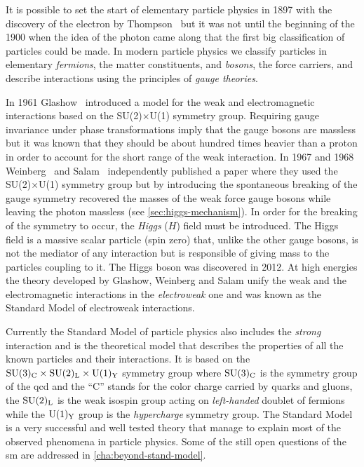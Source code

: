 It is possible to set the start of elementary particle physics in 1897 with the
discovery of the electron by Thompson~\cite{ThompsonBook} but it was not until
the beginning of the 1900 when the idea of the photon came along that the first
big classification of particles could be made. In modern particle physics we
classify particles in elementary \emph{fermions}, the matter constituents, and
\emph{bosons}, the force carriers, and describe interactions using the
principles of \emph{gauge theories}.

In 1961 Glashow~\cite{GlashowPaper} introduced a model for the weak and
electromagnetic interactions based on the SU(2)$\times$U(1) symmetry
group. Requiring gauge invariance under phase transformations imply that the
gauge bosons are massless but it was known that they should be about hundred
times heavier than a proton in order to account for the short range of the weak
interaction. In 1967 and 1968 Weinberg~\cite{WeinbergPaper} and
Salam~\cite{SalamPaper} independently published a paper where they used the
SU(2)$\times$U(1) symmetry group but by introducing the spontaneous breaking of
the gauge symmetry recovered the masses of the weak force gauge bosons while
leaving the photon massless (see \cref{sec:higgs-mechanism}). In order for the
breaking of the symmetry to occur, the \emph{Higgs} ($H$) field must be
introduced. The Higgs field is a massive scalar particle (spin zero) that,
unlike the other gauge bosons, is not the mediator of any interaction but is
responsible of giving mass to the particles coupling to it. The Higgs boson was
discovered in 2012. At high energies the theory developed by Glashow, Weinberg
and Salam unify the weak and the electromagnetic interactions in the
\emph{electroweak} one and was known as the Standard Model of electroweak
interactions.

Currently the Standard Model of particle physics also includes the \emph{strong}
interaction and is the theoretical model that describes the properties of all
the known particles and their interactions. It is based on the
$\mathrm{SU}(3)_\mathrm{C} \times \mathrm{SU}(2)_\mathrm{L} \times \mathrm{U}(1)_\mathrm{Y}$ symmetry group where $\mathrm{SU}(3)_\mathrm{C}$ is the
symmetry group of the \gls{qcd} and the ``C'' stands for the color charge
carried by quarks and gluons, the $\mathrm{SU}(2)_\mathrm{L}$ is the weak isospin group acting on
\emph{left-handed} doublet of fermions while the $\mathrm{U}(1)_\mathrm{Y}$ group is the
\emph{hypercharge} symmetry group. The Standard Model is a very successful and
well tested theory that manage to explain most of the observed phenomena in
particle physics. Some of the still open questions of the \gls{sm} are addressed
in \cref{cha:beyond-stand-model}.
